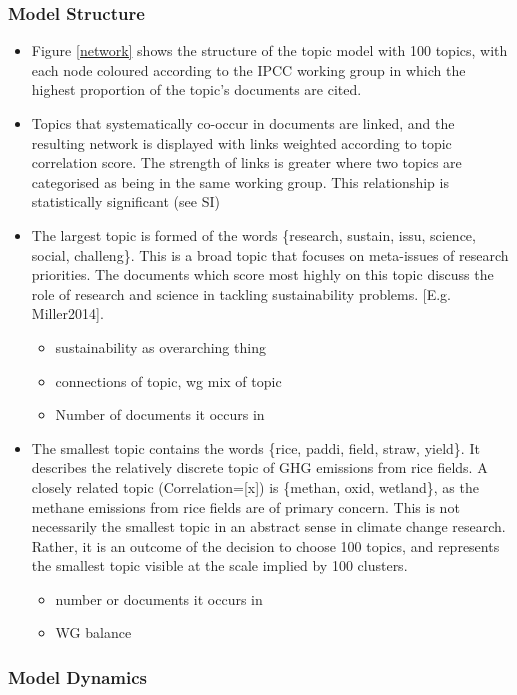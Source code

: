 \documentclass{article}
\begin{document}
\subsubsection*{Model Structure}
\begin{itemize}
	\item Figure \ref{network} shows the structure of the topic model with 100 topics, with each node coloured according to the IPCC working group in which the highest proportion of the topic's documents are cited.
    \item Topics that systematically co-occur in documents are linked, and the resulting network is displayed with links weighted according to topic correlation score. The strength of links is greater where two topics are categorised as being in the same working group. This relationship is statistically significant (see SI)
    \item The largest topic is formed of the words \{research, sustain, issu, science, social, challeng\}. This is a broad topic that focuses on meta-issues of research priorities. The documents which score most highly on this topic discuss the role of research and science in tackling sustainability problems. [E.g. Miller2014].
    \begin{itemize}
    	\item sustainability as overarching thing
    	\item connections of topic, wg mix of topic
    	\item Number of documents it occurs in
    \end{itemize}
	\item The smallest topic contains the words \{rice, paddi, field, straw, yield\}.  It describes the relatively discrete topic of GHG emissions from rice fields. A closely related topic (Correlation=[x]) is \{methan, oxid, wetland\}, as the methane emissions from rice fields are of primary concern. This is not necessarily the smallest topic in an abstract sense in climate change research. Rather, it is an outcome of the decision to choose 100 topics, and represents the smallest topic visible at the scale implied by 100 clusters.
	\begin{itemize}
		\item number or documents it occurs in
		\item WG balance
	\end{itemize}
\end{itemize}

\subsubsection*{Model Dynamics}
\end{document}
